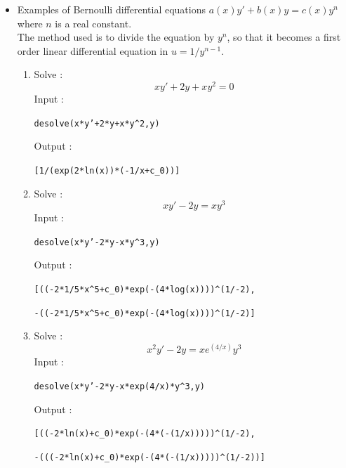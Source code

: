 \documentclass[a4paper,11pt]{book}
\begin{document}
\begin{itemize}
\item Examples of Bernoulli differential equations 
$a(x)y'+b(x)y=c(x)y^n$ where $n$ is a real constant.\\
The method used is to divide the equation by $y^n$, 
so that it becomes a first order linear differential equation 
in $u=1/y^{n-1}$.
\begin{enumerate}
\item 
Solve :
$$xy'+2y+xy^2=0$$
Input :
\begin{center}{\tt desolve(x*y'+2*y+x*y\verb|^|2,y)}\end{center}
Output :
\begin{center}{\tt [1/(exp(2*ln(x))*(-1/x+c\_0))]}\end{center}
\item
Solve :
$$xy'-2y=xy^3$$
Input :
\begin{center}{\tt desolve(x*y'-2*y-x*y\verb|^|3,y)}\end{center}
Output :
\begin{center}{\tt [((-2*1/5*x\verb|^|5+c\_0)*exp(-(4*log(x))))\verb|^|(1/-2),}\end{center}
\begin{center}{\tt -((-2*1/5*x\verb|^|5+c\_0)*exp(-(4*log(x))))\verb|^|(1/-2)]}\end{center}
\item 
Solve :
$$x^2y'-2y=xe^{(4/x)}y^3$$
Input :
\begin{center}{\tt desolve(x*y'-2*y-x*exp(4/x)*y\verb|^|3,y)}\end{center}
Output  :
\begin{center}{\tt [((-2*ln(x)+c\_0)*exp(-(4*(-(1/x)))))\verb|^|(1/-2),}\end{center}
\begin{center}{\tt -(((-2*ln(x)+c\_0)*exp(-(4*(-(1/x)))))\verb|^|(1/-2))]}\end{center}
\end{enumerate}


\end{itemize}
\end{document}
